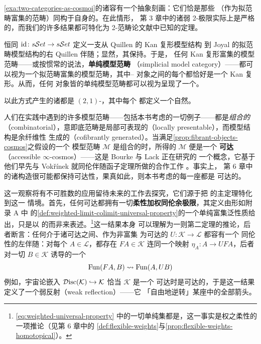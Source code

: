 \cref{exa:two-categories-as-cosmoi}的诸\trInfinityCosmos{}容有一个抽象刻画：它们恰是那些
（作为拟范畴富集的范畴）同构于自身\trHomotopyTwoCategory{}的\trInfinityCosmos。在此情形，
第 3 章中的诸弱 2-极限实际上是严格的，而我们的许多结果都可特化为 2-范畴论文献中已知的定理。

\begin{example}[作为∞-宇宙的单纯模型范畴]\label{exa:simplicial-model-categories-as-cosmoi}
恒同\trFunctor{} $\mathrm{id}\colon s\mathcal{S}et\to s\mathcal{S}et$ 定义一支从 Quillen 的 Kan 复形模型结构
到 Joyal 的拟范畴模型结构的右 Quillen 伴随；显然，其\trLeftAdjoint{}保持\trProduct。于是，
任何 Kan 复形富集的模型范畴——或按惯常的说法，\textbf{单纯模型范畴}
（simplicial model category）——都可以视为一个拟范畴富集的模型范畴，其中\trFibrant{}–%
\trCofibrant{}对象之间的每个\trMappingSpace{}都恰好是一个 Kan 复形。从而，任何\trFibrant{}%
对象皆\trCofibrant{}的单纯模型范畴都可以视为呈现了一个\trInfinityCosmos。
\end{example}

以此方式产生的诸\trHomotopyTwoCategory{}都是 $(2,1)$-\trCategory，其中每个%
\trNaturalTransformation{}都定义一个自然\trIsomorphism。

\begin{digression}[论可达∞-宇宙]\label{dig:accessible-cosmoi}
人们在实践中遇到的许多模型范畴——包括本书考虑的一切例子——都是\emph{组合的}
（combinatorial），意即底范畴是局部可表现的（locally presentable），而模型结构是余纤维性
生成的（cofibrantly generated）。当满足\cref{prop:fibrant-objects-cosmos}之假设的一个
模型范畴 $\mathcal{M}$ 是组合的时，所得的\trInfinityCosmos{} $\mathcal{M}$ 便是一个%
\textbf{可达\trInfinityCosmos}（accessible $\infty$-cosmos）——这是 Bourke 与 Lack 正在研究的
一个概念，它基于他们早先与 Vokřínek 就同伦伴随函子定理所做的合作工作 \cite{bib22}。事实上，
第 6 章中的诸构造很可能都保持可达性，果真如此，则本书考虑的每一座\trInfinityCosmos{}都是
可达的。
\end{digression}

这一观察将有不可胜数的应用留待未来的工作去探究，它们源于把 \cite{bib22} 的主定理特化到这一
情境。首先，任何可达\trInfinityCosmos{}都拥有一切\textbf{柔性加权同伦余极限}，其定义由形如附录 A 中
的\cref{def:weighted-limit-colimit-universal-property}的一个单纯富集泛性质给出，只是以%
\trQuasiCategory{}的\trEquivalence{}而非\trIsomorphism{}来表述。\footnote{\eqref{eq:weighted-universal-property}
中的一切单纯集都是\trQuasiCategory，这一事实是权之柔性的一项推论（见第 6 章中的%
\cref{def:flexible-weights}与\cref{prop:flexible-weights-homotopical}）。}这一结果本身
可以理解为一则第二定理的推论，后者断言：任何介于诸可达\trInfinityCosmos{}之间、作为非富集%
\trFunctor{}为可达的\trCosmologicalFunctor{} $U\colon\mathcal{K}\to\mathcal{L}$ 都容有一个
同伦性的左伴随：对每个 $A\in\mathcal{L}$，都存在 $FA\in\mathcal{K}$ 连同一个映射
$\eta_{A}\colon A\to UFA$，后者对一切 $B\in\mathcal{K}$ 诱导\trQuasiCategory{}的一个%
\trEquivalence
\[
\operatorname{Fun}(FA,B)\rightsquigarrow \operatorname{Fun}(A,UB)
\]
例如，宇宙论嵌入 $\mathcal{D}\mathrm{isc}(\mathcal{K})\hookrightarrow\mathcal{K}$ 恰当 $\mathcal{K}$ 是一个
可达\trInfinityCosmos{}时是可达的，于是这一结果定义了一个弱反射（weak reflection）——它
「自由地逆转」某座\trInfinityCategory{}中的全部箭头。

